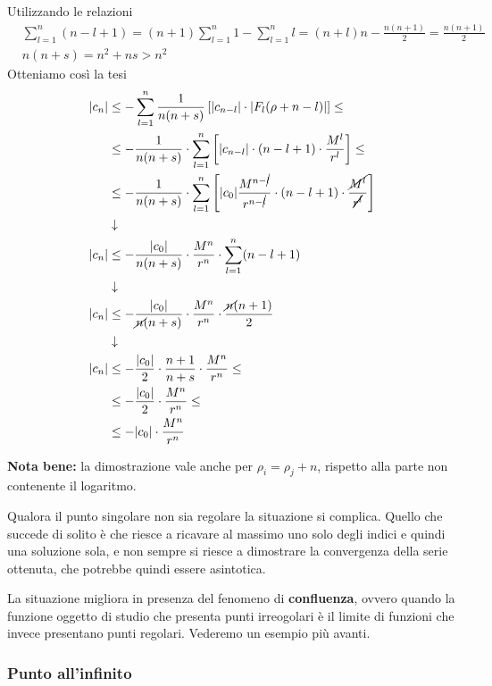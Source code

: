 \begin{enumerate}
	Utilizzando le relazioni
	\begin{align}
		&\sum_{l=1}^{n} (n-l+1) = (n+1)\sum_{l=1}^{n} 1 - \sum_{l=1}^{n}l = (n+l)n - \frac{n(n+1)}{2} = \frac{n(n+1)}{2}\\
		&n(n+s) = n^2 + ns > n^2
	\end{align}	
	Otteniamo così la tesi
	\begin{align}
		|c_n| &\leq -\sum_{l=1}^{n} \frac{1}{n(n+s)} \left[|c_{n-l}| \cdot |F_l (\rho + n -l )| \right] \leq \nonumber \\
			  &\leq - \frac{1}{n(n+s)} \cdot \sum_{l=1}^{n}  \left[|c_{n-l}| \cdot (n-l+1) \cdot \frac{M^l}{r^l}	 \right] \leq \nonumber \\
			  &\leq - \frac{1}{n(n+s)} \cdot \sum_{l=1}^{n}  \left[ |c_0|\frac{M^{n-\cancel{l}}}{r^{n-\cancel{l}}} \cdot (n-l+1) \cdot \frac{\cancel{M^l}}{\cancel{r^l}}	 \right] \\ &\downarrow \nonumber \\
		|c_n| &\leq - \frac{|c_0|}{n(n+s)}\cdot \frac{M^n}{r^n} \cdot \sum_{l=1}^{n}(n-l+1) \\ &\downarrow \nonumber \\
		|c_n| &\leq - \frac{|c_0|}{\cancel{n}(n+s)}\cdot \frac{M^n}{r^n}\cdot \frac{\cancel{n}(n+1)}{2}\\ &\downarrow \nonumber \\
		|c_n| &\leq - \frac{|c_0|}{2}\cdot \frac{n+1}{n+s}\cdot \frac{M^n}{r^n} \leq \nonumber\\
			  &\leq - \frac{|c_0|}{2}\cdot \frac{M^n}{r^n} \leq \nonumber\\
			  &\leq - |c_0|\cdot \frac{M^n}{r^n}
	\end{align}
\end{enumerate}

\textbf{Nota bene:} la dimostrazione vale anche per $\rho_i = \rho_j + n$, rispetto alla parte non contenente il logaritmo.

Qualora il punto singolare non sia regolare la situazione si complica. Quello che succede di solito è che riesce a ricavare al massimo uno solo degli indici e quindi una soluzione sola, e non sempre si riesce a dimostrare la convergenza della serie ottenuta, che potrebbe quindi essere asintotica.

La situazione migliora in presenza del fenomeno di \textbf{confluenza}, ovvero quando la funzione oggetto di studio che presenta punti irreogolari è il limite di funzioni che invece presentano punti regolari. Vederemo un esempio più avanti.

\newpage

\subsubsection{Punto all'infinito}

